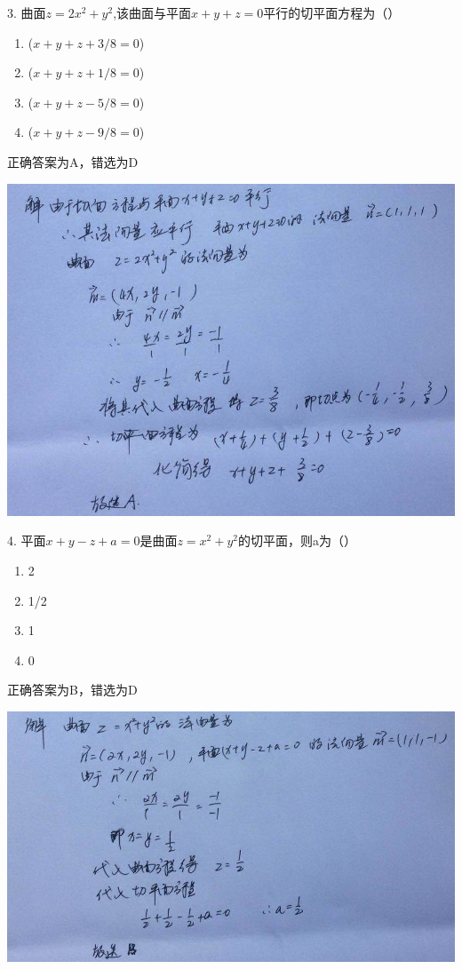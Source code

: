 \documentclass[fleqn]{article}
\begin{document}
\begin{flushleft}
3. 曲面$z=2x^2+y^2$,该曲面与平面$x+y+z=0$平行的切平面方程为（）
\begin{enumerate}
	\item ($x+y+z+3/8=0$)
	\item ($x+y+z+1/8=0$)
	\item ($x+y+z-5/8=0$)
	\item ($x+y+z-9/8=0$)
\end{enumerate}
正确答案为A，错选为D

\includegraphics[scale=0.5]{10.jpg}

4. 平面$x+y-z+a=0$是曲面$z=x^2+y^2$的切平面，则a为（）
\begin{enumerate}
	\item 2
	\item 1/2
	\item 1
	\item 0
\end{enumerate}
正确答案为B，错选为D

\includegraphics[scale=0.5]{11.jpg}


\end{flushleft}
\end{document}
